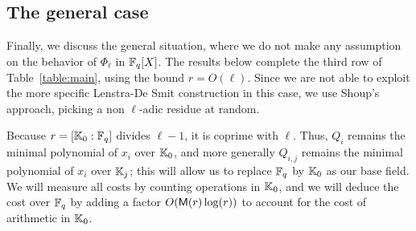 \documentclass{sig-alternate}
\begin{document}



\subsection{The general case}

Finally, we discuss the general situation, where we do not make any
assumption on the behavior of $\Phi_\ell$ in $\mathbb{F}_q[X]$. The results
below complete the third row of Table~\ref{table:main}, using the
bound $r=O(\ell)$. Since we are not able to exploit the more specific
Lenstra-De Smit construction in this case, we use Shoup's approach,
picking a non $\ell$-adic residue at random.

Because $r=[\mathbb{K}_0 : \mathbb{F}_q]$ divides $\ell-1$, it is coprime with
$\ell$. Thus, $Q_i$ remains the minimal polynomial of $x_i$ over
$\mathbb{K}_0$, and more generally $Q_{i,j}$ remains the minimal polynomial of
$x_i$ over $\mathbb{K}_{j}$; this will allow us to replace $\mathbb{F}_q$ by $\mathbb{K}_0$ as
our base field. We will measure all costs by counting operations in
$\mathbb{K}_0$, and we will deduce the cost over $\mathbb{F}_q$ by adding a factor
$O(\mathsf{M}(r)\log(r))$ to account for the cost of arithmetic in $\mathbb{K}_0$.
\end{document}
